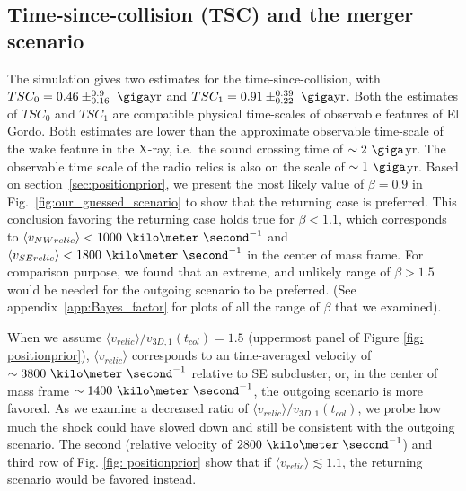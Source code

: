 \subsection{Time-since-collision (TSC) and the merger scenario}
The simulation gives two estimates for
the time-since-collision, with $TSC_0 = 0.46\pm^{0.9}_{0.16}~\giga \text{yr}$
and $TSC_1 =0.91\pm^{0.39}_{0.22}~\giga\text{yr}$. Both the estimates of $TSC_0$ and $TSC_1$ are
compatible physical time-scales of observable features of El Gordo.  
Both estimates are lower than the approximate observable time-scale of the
wake feature in the X-ray, i.e.\ the sound crossing time of $\sim2~\giga$yr. 
The observable time scale of the radio relics is also on the scale of
$\sim1~\giga$yr. 
Based on section~\ref{sec:positionprior}, we present the most likely
value of $\beta = 0.9$ in Fig.~\ref{fig:our_guessed_scenario} to show that
the returning case is preferred.
This conclusion favoring the returning case holds true for $\beta < 1.1$,
which corresponds to 
$\langle v_{NW relic} \rangle <
1000~\kilo\meter~\second^{-1}$ and 
$\langle v_{SE relic} \rangle < 1800~\kilo\meter~\second^{-1}$  
in the center of mass frame. For comparison purpose, we found that an extreme, and
unlikely range of $\beta > 1.5$ would be needed for the outgoing scenario
to be preferred. (See appendix~\ref{app:Bayes_factor} for plots of all the range of
$\beta$ that we examined). 

When we
assume $\langle v_{relic} \rangle / v_{3D, 1}(t_{col}) = 1.5$ (uppermost
panel of Figure \ref{fig: positionprior}), $\langle v_{relic} \rangle$
corresponds to an time-averaged velocity of $\sim3800~\kilo
\meter~\second^{-1}$ relative to SE subcluster, or, in the center of
mass frame $\sim1400~\kilo\meter~\second^{-1}$, the outgoing scenario 
is more favored.
As we examine a decreased ratio of  $\langle v_{relic} \rangle /
v_{3D,1}(t_{col})$, we probe how much the shock could have slowed down
and still be consistent with the outgoing scenario. The second (relative
velocity of $2800~\kilo\meter~\second^{-1}$) and third row of
Fig. \ref{fig: positionprior} show that if $\langle v_{relic} \rangle
\lesssim 1.1 $, the returning scenario would be favored instead. 

